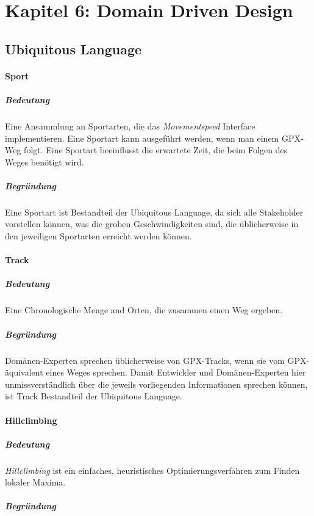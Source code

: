 \section{Kapitel 6: Domain Driven Design}

\subsection{Ubiquitous Language}

\paragraph{Sport}

\subparagraph{Bedeutung}

Eine Ansammlung an Sportarten, die das \textit{Movementspeed} Interface implementieren. Eine Sportart kann ausgeführt werden, wenn man einem GPX-Weg folgt. Eine Sportart beeinflusst die erwartete Zeit, die beim Folgen des Weges benötigt wird.

\subparagraph{Begründung}

Eine Sportart ist Bestandteil der Ubiquitous Language, da sich alle Stakeholder vorstellen können, was die groben Geschwindigkeiten sind, die üblicherweise in den jeweiligen Sportarten erreicht werden können.

\paragraph{Track}

\subparagraph{Bedeutung}

Eine Chronologische Menge and Orten, die zusammen einen Weg ergeben. 

\subparagraph{Begründung}

Domänen-Experten sprechen üblicherweise von GPX-Tracks, wenn sie vom GPX-äquivalent eines Weges sprechen. Damit Entwickler und Domänen-Experten hier unmissverständlich über die jeweils vorliegenden Informationen sprechen können, ist Track Bestandteil der Ubiquitous Language.

\paragraph{Hillclimbing}

\subparagraph{Bedeutung}

\textit{Hillclimbing} ist ein einfaches, heuristisches Optimierungsverfahren zum Finden lokaler Maxima.

\subparagraph{Begründung}

